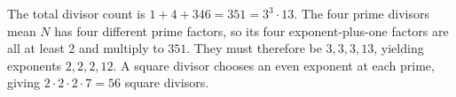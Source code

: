 The total divisor count is $1+4+346=351=3^3\cdot13$. The four prime divisors mean $N$ has four different prime factors, so its four exponent-plus-one factors are all at least $2$ and multiply to $351$. They must therefore be $3,3,3,13$, yielding exponents $2,2,2,12$. A square divisor chooses an even exponent at each prime, giving $2\cdot2\cdot2\cdot7=\boxed{56}$ square divisors.
